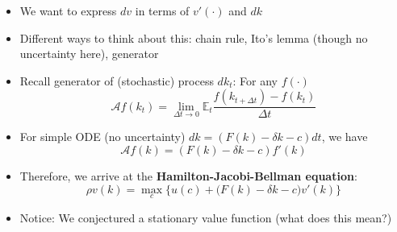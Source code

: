 \documentclass[10pt]{beamer}
\begin{document}
\begin{frame}{}
\begin{itemize}
\item We want to express $dv$ in terms of $v'(\cdot)$ and $dk$

\item Different ways to think about this: chain rule, Ito's lemma (though no uncertainty here), generator

\item Recall generator of (stochastic) process $dk_t$: For any $f(\cdot)$
\begin{equation*}
	\mathcal A f(k_t) = \lim_{\Delta t \to 0} \mathbb{E}_t \frac{ f(k_{t + \Delta t}) - f(k_t) }{\Delta t}
\end{equation*}

\item For simple ODE (no uncertainty) $dk = (F(k) - \delta k - c) dt$, we have
\begin{equation*}
	\mathcal A f(k) = (F(k) - \delta k - c) f'(k)
\end{equation*}

\item Therefore, we arrive at the \textbf{Hamilton-Jacobi-Bellman equation}:
\begin{equation*}
	\rho v(k) = \max_c \Big\{ u(c) + \Big( F(k) - \delta k - c \Big) v'(k) \Big\}
\end{equation*}

\item Notice: We conjectured a stationary value function (what does this mean?)
\end{itemize}
\end{frame}
\end{document}
